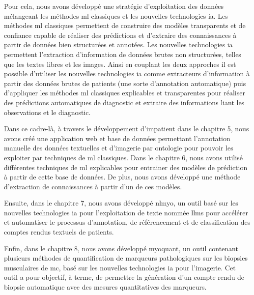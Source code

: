 Pour cela, nous avons développé une stratégie d'exploitation des données mélangeant les méthodes \gls{ml} classiques et les nouvelles technologies \gls{ia}. Les méthodes \gls{ml} classiques permettent de construire des modèles transparents et de confiance capable de réaliser des prédictions et d'extraire des connaissances à partir de données bien structurées et annotées. Les nouvelles technologies \gls{ia} permettent l'extraction d'information de données brutes non structurées, telles que les textes libres et les images. Ainsi en couplant les deux approches il est possible d'utiliser les nouvelles technologies \gls{ia} comme extracteurs d'information à partir des données brutes de patients (une sorte d'annotation automatique) puis d'appliquer les méthodes \gls{ml} classiques explicables et transparentes pour réaliser des prédictions automatiques de diagnostic et extraire des informations liant les observations et le diagnostic.

Dans ce cadre-là, à travers le développement d'\gls{impatient} dans le chapitre 5, nous avons créé une application web et base de données permettant l'annotation manuelle des données textuelles et d'imagerie par ontologie pour pouvoir les exploiter par techniques de \gls{ml} classiques. Dans le chapitre 6, nous avons utilisé différentes techniques de \gls{ml} explicables pour entrainer des modèles de prédiction à partir de cette base de données. De plus, nous avons développé une méthode d'extraction de connaissances à partir d'un de ces modèles. 

Ensuite, dans le chapitre 7, nous avons développé \gls{nlmyo}, un outil basé sur les nouvelles technologies \gls{ia} pour l'exploitation de texte nommée \gls{llms} pour accélérer et automatiser le processus d'annotation, de référencement et de classification des comptes rendus textuels de patients.

Enfin, dans le chapitre 8, nous avons développé \gls{myoquant}, un outil contenant plusieurs méthodes de quantification de marqueurs pathologiques sur les biopsies musculaires de \gls{mc}, basé sur les nouvelles technologies \gls{ia} pour l'imagerie. Cet outil a pour objectif, à terme, de permettre la génération d'un compte rendu de biopsie automatique avec des mesures quantitatives des marqueurs.
